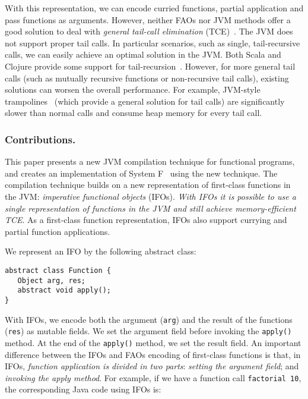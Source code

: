 \noindent With this representation,
we can encode curried functions, partial application and
pass functions as arguments.
However, neither FAOs nor JVM methods offer a good solution to
deal with \emph{general tail-call elimination}
(TCE)~\cite{Steele1977}. The JVM does not support proper tail calls.
In particular scenarios, such as single, tail-recursive calls, we can
easily achieve an optimal solution in the JVM.  Both Scala and Clojure
provide some support for tail-recursion~\cite{Odersky2014b,recur}.
However, for more general tail calls (such as mutually recursive
functions or non-recursive tail calls), existing solutions can worsen
the overall performance. For example, JVM-style trampolines~\cite{Schinz2001}
(which provide a general solution for tail calls) are significantly
slower than normal calls and consume heap memory for every tail call.

\subsubsection{Contributions.}
This paper presents a new JVM compilation technique for
functional programs, and creates an implementation of System
F~\cite{girard72dissertation,reynolds74towards} using the new
technique. The compilation technique builds on a new representation of
first-class functions in the JVM: \emph{imperative functional
  objects} (IFOs).
\emph{With IFOs it is possible to use a single
 representation of functions in the JVM and still achieve memory-efficient TCE}.
 As a first-class function representation, IFOs also support currying and
 partial function applications.

We represent an IFO by the following abstract class:

\begin{lstlisting}
abstract class Function {
   Object arg, res;
   abstract void apply();
}
\end{lstlisting}

\noindent With IFOs, we encode both the argument
(\lstinline{arg}) and the result of the functions (\lstinline{res})
as mutable fields.
We set the argument field before
invoking the \lstinline{apply()} method. At the end of the \lstinline{apply()} method, we set  the result field.
An important difference between the IFOs and FAOs encoding of
first-class functions is that, in IFOs, \emph{function application is
divided in two parts}: \emph{setting the argument field}; and \emph{invoking the
apply method}.
For example, if we have a function call
\lstinline{factorial 10}, the corresponding Java code using IFOs
is:

